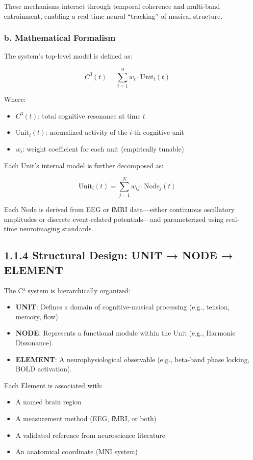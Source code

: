 These mechanisms interact through temporal coherence and multi-band entrainment, enabling a real-time neural “tracking” of musical structure.

\subsubsection*{b. Mathematical Formalism}

The system's top-level model is defined as:

\[
C^3(t) = \sum_{i=1}^{9} w_i \cdot \text{Unit}_i(t)
\]

Where:

\begin{itemize}
    \item $C^3(t)$: total cognitive resonance at time $t$
    \item $\text{Unit}_i(t)$: normalized activity of the $i$-th cognitive unit
    \item $w_i$: weight coefficient for each unit (empirically tunable)
\end{itemize}

Each Unit’s internal model is further decomposed as:

\[
\text{Unit}_i(t) = \sum_{j=1}^{N} w_{ij} \cdot \text{Node}_j(t)
\]

Each Node is derived from EEG or fMRI data—either continuous oscillatory amplitudes or discrete event-related potentials—and parameterized using real-time neuroimaging standards.

\subsection*{1.1.4 Structural Design: UNIT → NODE → ELEMENT}

The C³ system is hierarchically organized:

\begin{itemize}
    \item \textbf{UNIT}: Defines a domain of cognitive-musical processing (e.g., tension, memory, flow).
    \item \textbf{NODE}: Represents a functional module within the Unit (e.g., Harmonic Dissonance).
    \item \textbf{ELEMENT}: A neurophysiological observable (e.g., beta-band phase locking, BOLD activation).
\end{itemize}

Each Element is associated with:

\begin{itemize}
    \item A named brain region
    \item A measurement method (EEG, fMRI, or both)
    \item A validated reference from neuroscience literature
    \item An anatomical coordinate (MNI system)
\end{itemize}

